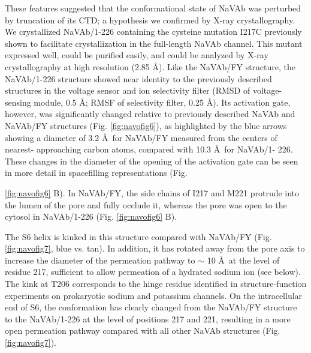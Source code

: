 \begin{refsection}
These features suggested that the conformational state of NaVAb was perturbed by truncation of its CTD; a hypothesis we confirmed by X-ray crystallography. We crystallized NaVAb/1-226 containing the cysteine mutation I217C previously shown to facilitate crystallization in the full-length NaVAb channel. This mutant expressed well, could be purified easily, and could be analyzed by X-ray crystallography at high resolution (2.85 \AA). Like the NaVAb/FY structure, the NaVAb/1-226 structure showed near identity to the previously described structures in the voltage sensor and ion selectivity filter (RMSD of voltage-sensing module, 0.5 \AA; RMSF of selectivity filter, 0.25 \AA). Its activation gate, however, was significantly changed relative to previously described NaVAb and NaVAb/FY structures (Fig. \ref{fig:navofig6}), as highlighted by the blue arrows showing a diameter of 3.2 \AA \, for NaVAb/FY measured from the centers of nearest- approaching carbon atoms, compared with 10.3 \AA \, for NaVAb/1- 226. These changes in the diameter of the opening of the activation gate can be seen in more detail in spacefilling representations (Fig. {\ref{fig:navofig6} B). In NaVAb/FY, the side chains of I217 and M221 protrude into the lumen of the pore and fully occlude it, whereas the pore was open to the cytosol in NaVAb/1-226 (Fig. \ref{fig:navofig6} B).

The S6 helix is kinked in this structure compared with NaVAb/FY (Fig. \ref{fig:navofig7}, blue vs. tan). In addition, it has rotated away from the pore axis to increase the diameter of the permeation pathway to $\sim$ 10 \AA \, at the level of residue 217, sufficient to allow permeation of a hydrated sodium ion (see below). The kink at T206 corresponds to the hinge residue identified in structure-function experiments on prokaryotic sodium and potassium channels. On the intracellular end of S6, the conformation has clearly changed from the NaVAb/FY structure to the NaVAb/1-226 at the level of positions 217 and 221, resulting in a more open permeation pathway compared with all other NaVAb structures (Fig. \ref{fig:navofig7}). 

}
\end{refsection}
